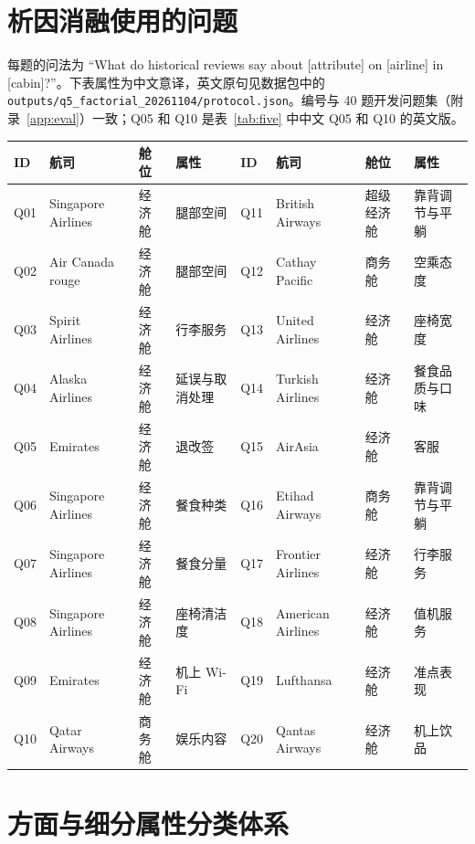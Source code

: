 \documentclass[10pt,twocolumn,a4paper]{article}
\begin{document}
\section{析因消融使用的问题}
\label{app:factorial}

每题的问法为 “What do historical reviews say about [attribute] on [airline] in [cabin]?”。下表属性为中文意译，英文原句见数据包中的 \texttt{outputs/q5\_factorial\_20261104/protocol.json}。编号与 40 题开发问题集（附录~\ref{app:eval}）一致；Q05 和 Q10 是表~\ref{tab:five} 中中文 Q05 和 Q10 的英文版。

\begin{center}\small
\begin{tabular}{@{}llll@{\hspace{10mm}}llll@{}}
\toprule
\textbf{ID} & \textbf{航司} & \textbf{舱位} & \textbf{属性} & \textbf{ID} & \textbf{航司} & \textbf{舱位} & \textbf{属性} \\
\midrule
Q01 & Singapore Airlines & 经济舱 & 腿部空间 & Q11 & British Airways & 超级经济舱 & 靠背调节与平躺 \\
Q02 & Air Canada rouge & 经济舱 & 腿部空间 & Q12 & Cathay Pacific & 商务舱 & 空乘态度 \\
Q03 & Spirit Airlines & 经济舱 & 行李服务 & Q13 & United Airlines & 经济舱 & 座椅宽度 \\
Q04 & Alaska Airlines & 经济舱 & 延误与取消处理 & Q14 & Turkish Airlines & 经济舱 & 餐食品质与口味 \\
Q05 & Emirates & 经济舱 & 退改签 & Q15 & AirAsia & 经济舱 & 客服 \\
Q06 & Singapore Airlines & 经济舱 & 餐食种类 & Q16 & Etihad Airways & 商务舱 & 靠背调节与平躺 \\
Q07 & Singapore Airlines & 经济舱 & 餐食分量 & Q17 & Frontier Airlines & 经济舱 & 行李服务 \\
Q08 & Singapore Airlines & 经济舱 & 座椅清洁度 & Q18 & American Airlines & 经济舱 & 值机服务 \\
Q09 & Emirates & 经济舱 & 机上 Wi-Fi & Q19 & Lufthansa & 经济舱 & 准点表现 \\
Q10 & Qatar Airways & 商务舱 & 娱乐内容 & Q20 & Qantas Airways & 经济舱 & 机上饮品 \\
\bottomrule
\end{tabular}
\end{center}

\section{方面与细分属性分类体系}
\label{app:taxonomy}
\end{document}
